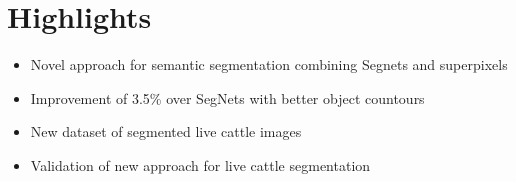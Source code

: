 \documentclass[review]{elsarticle}
\begin{document}
\thispagestyle{empty}
                                                             
\clearpage
\thispagestyle{empty}
\ifpreprint
  \vspace*{-1pc}
\fi

\ifpreprint\else\vspace*{-15pc}\fi

\section*{Highlights}

\begin{itemize}

\item Novel approach for semantic segmentation combining Segnets and superpixels

\item Improvement of 3.5\% over SegNets with better object countours 

\item New dataset of segmented live cattle images

\item Validation of new approach for live cattle segmentation



\end{itemize}

\ifpreprint
  \setcounter{page}{1}
\else
  \setcounter{page}{1}
\fi
\end{document}

